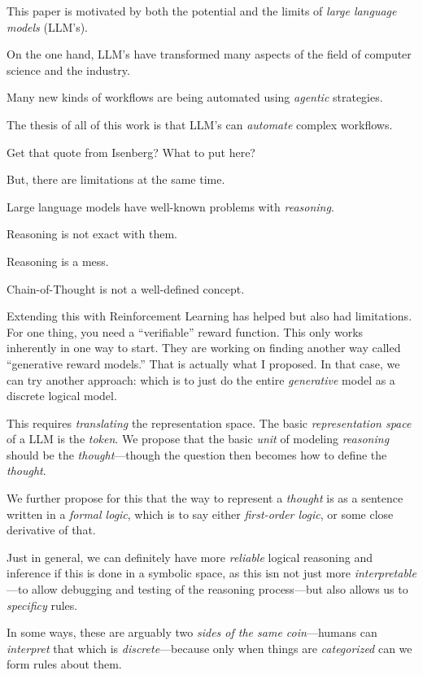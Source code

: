 \label{sec:contributions}

This paper is motivated by both the potential and the limits of {\em large language models} (LLM's).

On the one hand, LLM's have transformed many aspects of the field of computer science and the industry.

Many new kinds of workflows are being automated using {\em agentic} strategies.

The thesis of all of this work is that LLM's can {\em automate} complex workflows.

Get that quote from Isenberg? What to put here?

But, there are limitations at the same time.

Large language models have well-known problems with {\em reasoning}.

Reasoning is not exact with them.

Reasoning is a mess.

Chain-of-Thought is not a well-defined concept.

Extending this with Reinforcement Learning has helped but also had limitations.
For one thing, you need a ``verifiable'' reward function.
This only works inherently in one way to start.
They are working on finding another way called ``generative reward models.''
That is actually what I proposed.
In that case, we can try another approach: which is to just do the entire {\em generative} model as a discrete logical model.

This requires {\em translating} the representation space.
The basic {\em representation space} of a LLM is the {\em token}.
We propose that the basic {\em unit} of modeling {\em reasoning} should be the {\em thought}---though the question then becomes how to define the {\em thought}.

We further propose for this that the way to represent a {\em thought} is as a sentence written in a {\em formal logic}, which is to say either {\em first-order logic}, or some close derivative of that.

Just in general, we can definitely have more {\em reliable} logical reasoning and inference if this is done in a symbolic space, as this isn not just more {\em interpretable}---to allow debugging and testing of the reasoning process---but also allows us to {\em specificy} rules.

In some ways, these are arguably two {\em sides of the same coin}---humans can {\em interpret} that which is {\em discrete}---because only when things are {\em categorized} can we form rules about them.